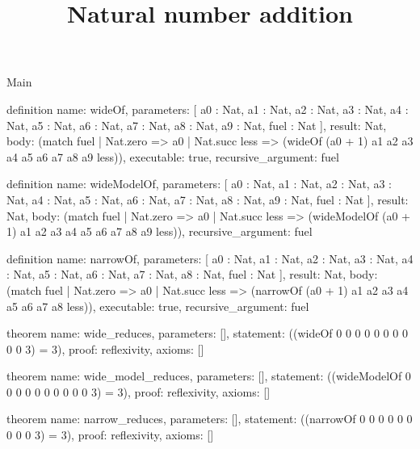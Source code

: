 \begin{lexlean}{Main}
\title{Natural number addition}
\begin{semanticmodule}
definition{
  name: wideOf,
  parameters: [
    a0 : Nat,
    a1 : Nat,
    a2 : Nat,
    a3 : Nat,
    a4 : Nat,
    a5 : Nat,
    a6 : Nat,
    a7 : Nat,
    a8 : Nat,
    a9 : Nat,
    fuel : Nat
  ],
  result: Nat,
  body: (match fuel
    | Nat.zero => a0
    | Nat.succ less => (wideOf (a0 + 1) a1 a2 a3 a4 a5 a6 a7 a8 a9 less)),
  executable: true,
  recursive_argument: fuel
}

definition{
  name: wideModelOf,
  parameters: [
    a0 : Nat,
    a1 : Nat,
    a2 : Nat,
    a3 : Nat,
    a4 : Nat,
    a5 : Nat,
    a6 : Nat,
    a7 : Nat,
    a8 : Nat,
    a9 : Nat,
    fuel : Nat
  ],
  result: Nat,
  body: (match fuel
    | Nat.zero => a0
    | Nat.succ less => (wideModelOf (a0 + 1) a1 a2 a3 a4 a5 a6 a7 a8 a9 less)),
  recursive_argument: fuel
}

definition{
  name: narrowOf,
  parameters: [
    a0 : Nat,
    a1 : Nat,
    a2 : Nat,
    a3 : Nat,
    a4 : Nat,
    a5 : Nat,
    a6 : Nat,
    a7 : Nat,
    a8 : Nat,
    fuel : Nat
  ],
  result: Nat,
  body: (match fuel
    | Nat.zero => a0
    | Nat.succ less => (narrowOf (a0 + 1) a1 a2 a3 a4 a5 a6 a7 a8 less)),
  executable: true,
  recursive_argument: fuel
}

theorem{
  name: wide_reduces,
  parameters: [],
  statement: ((wideOf 0 0 0 0 0 0 0 0 0 0 3) = 3),
  proof: reflexivity{},
  axioms: []
}

theorem{
  name: wide_model_reduces,
  parameters: [],
  statement: ((wideModelOf 0 0 0 0 0 0 0 0 0 0 3) = 3),
  proof: reflexivity{},
  axioms: []
}

theorem{
  name: narrow_reduces,
  parameters: [],
  statement: ((narrowOf 0 0 0 0 0 0 0 0 0 3) = 3),
  proof: reflexivity{},
  axioms: []
}
\end{semanticmodule}
\end{lexlean}
